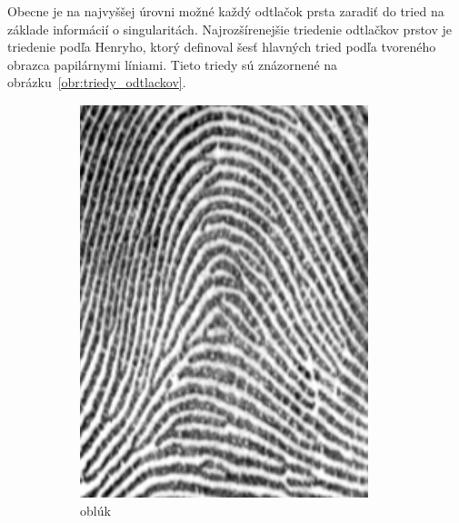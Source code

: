   Obecne je na najvyššej úrovni možné každý odtlačok prsta zaradiť do tried na základe informácií o singularitách. Najrozšírenejšie triedenie odtlačkov
  prstov je triedenie podľa Henryho, ktorý definoval šesť hlavných tried podľa tvoreného obrazca papilárnymi líniami. Tieto triedy sú znázornené
  na obrázku~{\ref{obr:triedy_odtlackov}}.
  \begin{figure}[h]\centering
    \centering
    \begin{subfigure}[b]{0.19\linewidth}
      \includegraphics[width=\linewidth]{obrazky-figures/obluk.png}
      \caption{oblúk}
      \label{obr:triedy_odtlackov/obluk}
    \end{subfigure}
    \hfill
    \begin{subfigure}[b]{0.19\linewidth}

\end{subfigure}
\end{figure}
